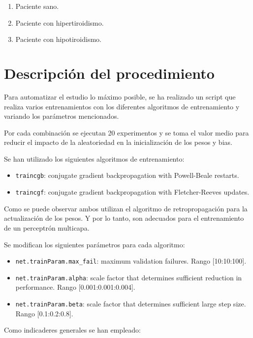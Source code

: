 \documentclass[a4paper,12pt,titlepage]{article}
\begin{document}
\begin{enumerate}[noitemsep]
	\item Paciente sano.
	\item Paciente con hipertiroidismo.
	\item Paciente con hipotiroidismo.
\end{enumerate}

\section{Descripción del procedimiento}

Para automatizar el estudio lo máximo posible, se ha realizado un script que realiza varios entrenamientos con los diferentes algoritmos de entrenamiento y variando los parámetros mencionados. 

Por cada combinación se ejecutan 20 experimentos y se toma el valor medio para reducir el impacto de la aleatoriedad en la inicialización de los pesos y bias.

Se han utilizado los siguientes algoritmos de entrenamiento:

\begin{itemize}[noitemsep]
	\item \lstinline|traincgb|: conjugate gradient backpropagation with Powell-Beale restarts. \citep{matlab:traincgb}
	\item \lstinline|traincgf|: conjugate gradient backpropagation with Fletcher-Reeves updates. \citep{matlab:traincgf}
\end{itemize}

Como se puede observar ambos utilizan el algoritmo de retropropagación para la actualización de los pesos. Y por lo tanto, son adecuados para el entrenamiento de un perceptrón multicapa.

Se modifican los siguientes parámetros para cada algoritmo:

\begin{itemize}[noitemsep]
	\item \lstinline|net.trainParam.max_fail|: maximum validation failures. Rango [10:10:100].
	\item \lstinline|net.trainParam.alpha|: scale factor that determines sufficient reduction in performance. Rango [0.001:0.001:0.004].
	\item \lstinline|net.trainParam.beta|: scale factor that determines sufficient large step size. Rango [0.1:0.2:0.8].
\end{itemize}

Como indicaderes generales se han empleado:
\end{document}
